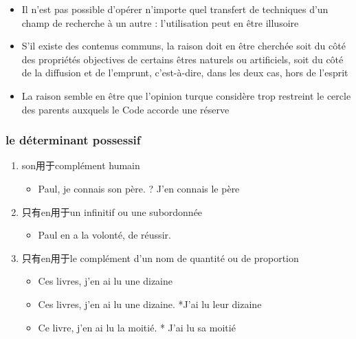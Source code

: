 \documentclass[UTF8]{report}
\begin{document}
\begin{enumerate}
\begin{enumerate}
\begin{enumerate}
            \begin{itemize}
                \item Il n’est pas possible d’opérer n’importe quel transfert de techniques d’un champ de recherche à un autre : l’utilisation peut en être illusoire
                \item S’il existe des contenus communs, la raison doit en être cherchée soit du côté des propriétés objectives de certains êtres naturels ou artificiels, soit du côté de la diffusion et de l’emprunt, c’est-à-dire, dans les deux cas, hors de l’esprit
                \item La raison semble en être que l’opinion turque considère trop restreint le cercle des parents auxquels le Code accorde une réserve
            \end{itemize}
        \end{enumerate}
    \end{enumerate}
\end{enumerate}

\subsubsection{le déterminant possessif}
\begin{enumerate}
    \item son用于complément humain
    \begin{itemize}
        \item Paul, je connais son père. ? J’en connais le père
    \end{itemize}
    \item 只有en用于un infinitif ou une subordonnée
    \begin{itemize}
        \item Paul en a la volonté, de réussir.
    \end{itemize}
    \item 只有en用于le complément d’un nom de quantité ou de proportion
    \begin{itemize}
        \item Ces livres, j’en ai lu une dizaine
        \item Ces livres, j’en ai lu une dizaine. *J’ai lu leur dizaine
        \item Ce livre, j’en ai lu la moitié. * J’ai lu sa moitié
    \end{itemize}
\end{enumerate}
\end{document}
